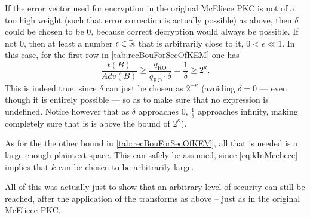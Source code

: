 If the error vector used for encryption in the original McEliece PKC is not of a too high weight (such that error correction is actually possible) as above, then $\delta$ could be chosen to be $0$, because correct decryption would always be possible. If not $0$, then at least a number $\epsilon \in \mathbb{R}$ that is arbitrarily close to it, $0 < \epsilon \ll 1$. In this case, for the first row in \cref{tab:recBouForSecOfKEM} one has
\[
	\frac{t\left(B\right)}{Adv\left(B\right)} \geq \frac{q_{\mathrm{RO}}}{q_{\mathrm{RO}} \cdot \delta} = \frac{1}{\delta} \geq 2^{\kappa}.
\]
This is indeed true, since $\delta$ can just be chosen as $2^{- \kappa}$ (avoiding $\delta = 0$ --- even though it is entirely possible --- so as to make sure that no expression is undefined. Notice however that as $\delta$ approaches $0$, $\frac{1}{\delta}$ approaches infinity, making completely sure that is is above the bound of $2^{\kappa}$).

As for the the other bound in \cref{tab:recBouForSecOfKEM}, all that is needed is a large enough plaintext space. This can safely be assumed, since \cref{eq:kInMceliece} implies that $k$ can be chosen to be arbitrarily large.

All of this was actually just to show that an arbitrary level of security can still be reached, after the application of the transforms as above -- just as in the original McEliece PKC.

